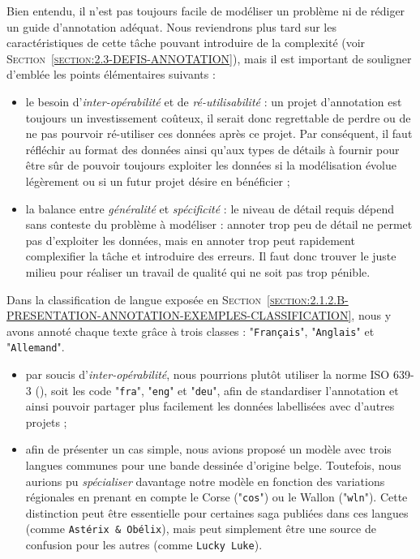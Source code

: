 			Bien entendu, il n'est pas toujours facile de modéliser un problème ni de rédiger un guide d'annotation adéquat.
			Nous reviendrons plus tard sur les caractéristiques de cette tâche pouvant introduire de la complexité (voir \textsc{Section~\ref{section:2.3-DEFIS-ANNOTATION}}), mais il est important de souligner d'emblée les points élémentaires suivants :
			\begin{itemize}
				\item le besoin d'\textit{inter-opérabilité} et de \textit{ré-utilisabilité} : un projet d'annotation est toujours un investissement coûteux, il serait donc regrettable de perdre ou de ne pas pourvoir ré-utiliser ces données après ce projet.
				Par conséquent, il faut réfléchir au format des données ainsi qu'aux types de détails à fournir pour être sûr de pouvoir toujours exploiter les données si la modélisation évolue légèrement ou si un futur projet désire en bénéficier ;
				\item la balance entre \textit{généralité} et \textit{spécificité} : le niveau de détail requis dépend sans conteste du problème à modéliser : annoter trop peu de détail ne permet pas d'exploiter les données, mais en annoter trop peut rapidement complexifier la tâche et introduire des erreurs.
				Il faut donc trouver le juste milieu pour réaliser un travail de qualité qui ne soit pas trop pénible.
			\end{itemize}
			\begin{leftBarExamples}
				Dans la classification de langue exposée en \textsc{Section~\ref{section:2.1.2.B-PRESENTATION-ANNOTATION-EXEMPLES-CLASSIFICATION}}, nous y avons annoté chaque texte grâce à trois classes : "\texttt{Français}", "\texttt{Anglais}" et "\texttt{Allemand}".
				\begin{itemize}
					\item par soucis d'\textit{inter-opérabilité}, nous pourrions plutôt utiliser la norme ISO 639-3 (\cite{international-organization-for-standardization:2007:codes-representation-names}), soit les code "\texttt{fra}", "\texttt{eng}" et "\texttt{deu}", afin de standardiser l'annotation et ainsi pouvoir partager plus facilement les données labellisées avec d'autres projets ;
					\item afin de présenter un cas simple, nous avions proposé un modèle avec trois langues communes pour une bande dessinée d'origine belge.
					Toutefois, nous aurions pu \textit{spécialiser} davantage notre modèle en fonction des variations régionales en prenant en compte le Corse ("\texttt{cos}") ou le Wallon ("\texttt{wln}").
					Cette distinction peut être essentielle pour certaines saga publiées dans ces langues (comme \texttt{Astérix \& Obélix}), mais peut simplement être une source de confusion pour les autres (comme \texttt{Lucky Luke}).
				\end{itemize}
			\end{leftBarExamples}
			
